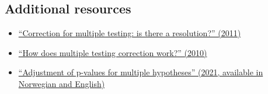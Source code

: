 \documentclass[letterpaper, 12pt]{article}
\begin{document}
\subsection*{Additional resources}

\begin{itemize}
    \setlength\itemsep{-0.5em}
    \item \href{https://doi.org/10.1378/chest.11-0523}{``Correction for multiple testing: is there a resolution?'' (2011)}
    \item \href{https://doi.org/10.1038/nbt1209-1135}{``How does multiple testing correction work?'' (2010)}
    \item \href{https://doi.org/10.4045/tidsskr.21.0357}{``Adjustment of p-values for multiple hypotheses'' (2021, available in Norwegian and English)}
\end{itemize}
\end{document}
